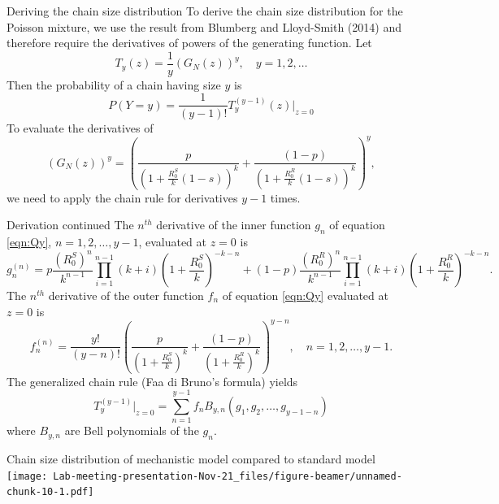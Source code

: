 \documentclass[
  ignorenonframetext,
]{beamer}
\begin{document}
\begin{frame}{Deriving the chain size distribution}
\protect\hypertarget{deriving-the-chain-size-distribution}{}
To derive the chain size distribution for the Poisson mixture, we use
the result from Blumberg and Lloyd-Smith (2014) and therefore require
the derivatives of powers of the generating function. Let
\[T_y(z) = \frac{1}{y} (G_N(z))^y, \quad y = 1, 2, \dots \] Then the
probability of a chain having size \(y\) is
\begin{equation}\label{eqn:cluster}
    P(Y = y)  = \frac{1}{(y-1)!}T_y^{(y-1)}(z) \Bigr|_{z=0} 
\end{equation} To evaluate the derivatives of
\begin{equation}\label{eqn:Qy}
    (G_N(z))^y = \left (\frac{p}{(1 + \frac{R_0^S}{k}(1-s))^k} +   \frac{(1-p)}{(1 + \frac{R_0^R}{k}(1-s))^k} \right)^y,
\end{equation} we need to apply the chain rule for derivatives \(y-1\)
times.
\end{frame}

\begin{frame}{Derivation continued}
\protect\hypertarget{derivation-continued}{}
The \(n^{th}\) derivative of the inner function \(g_n\) of equation
\eqref{eqn:Qy}, \(n = 1, 2, \dots, y-1\), evaluated at \(z=0\) is
\scriptsize \begin{equation*}
    g_n^(n) =  p \frac{(R_0^S)^n}{k^{n-1}} \displaystyle \prod_{i=1}^{n-1} (k+i) \left(1+\frac{R_0^S}{k}\right)^{-k-n}+ (1-p)\frac{(R_0^R)^n}{k^{n-1}} \displaystyle \prod_{i=1}^{n-1} (k+i)\left (1+\frac{R_0^R}{k}\right)^{-k-n}.
\end{equation*} \normalsize The \(n^{th}\) derivative of the outer
function \(f_n\) of equation \eqref{eqn:Qy} evaluated at \(z=0\) is
\begin{equation*}
    f_n^(n) =  \frac{y!}{(y-n)! }\left (\frac{p}{(1 + \frac{R_0^S}{k})^k} +   \frac{(1-p)}{(1 + \frac{R_0^R}{k})^k} \right )^{y-n}, \quad n = 1, 2, \dots, y-1.
\end{equation*} The generalized chain rule (Faa di Bruno's formula)
yields \begin{equation}\label{eqn:bell}
  T_y^{(y-1)} \Bigr|_{z=0} = \sum_{n=1}^{y-1}  f_n B_{y,n}(g_1, g_2, \dots, g_{y-1-n})
\end{equation} where \(B_{y,n}\) are Bell polynomials of the \(g_n\).
\end{frame}

\begin{frame}{Chain size distribution of mechanistic model compared to
standard model}
\protect\hypertarget{chain-size-distribution-of-mechanistic-model-compared-to-standard-model}{}
\texttt{[image: Lab-meeting-presentation-Nov-21\_files/figure-beamer/unnamed-chunk-10-1.pdf]}
\end{frame}
\end{document}
